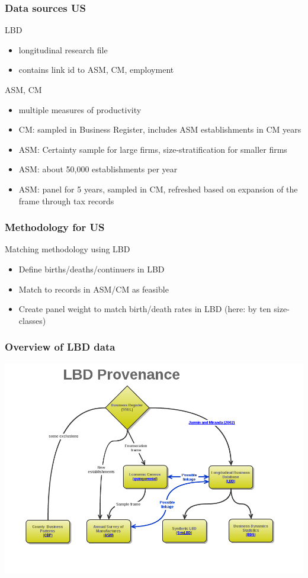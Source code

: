 \begin{slide}
\frametitle{Data sources US}
\begin{block}{LBD}
\begin{itemize}[<+->]
\item longitudinal research file \cite{MirandaJarmin2002}
\item contains link id to ASM, CM, employment
\end{itemize}
\end{block}
\begin{block}{ASM, CM}
\begin{itemize}[<+->]
\item multiple measures of productivity
\item CM: sampled in Business Register, includes ASM establishments in CM years
\item ASM: Certainty sample for large firms, size-stratification for smaller firms
\item ASM: about 50,000 establishments per year
\item ASM: panel for 5 years, sampled in CM, refreshed based on expansion of the frame through tax records
\end{itemize}
\end{block}
\end{slide}

\begin{frame}
\frametitle{Methodology for US}
\begin{block}{Matching methodology using LBD}
\begin{itemize}[<+->]
\item Define births/deaths/continuers in LBD
\item Match to records in ASM/CM as feasible
\item Create panel weight to match birth/death rates in LBD (here: by ten size-classes)
\end{itemize}
\end{block}
\end{frame}



\begin{slide}
\frametitle{Overview of LBD data}
\centering
\includegraphics[width=\textwidth]{LBD_Provenance}
\end{slide}


